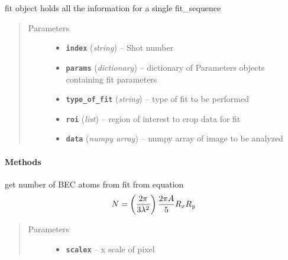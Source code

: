 \documentclass[letterpaper,10pt,english]{sphinxmanual}
\begin{document}
\begin{fulllineitems}
\label{fit_object:Fitobject.fit_object}
fit object holds all the information for a single fit\_sequence
\begin{quote}\begin{description}
\item[{Parameters}] \leavevmode\begin{itemize}
\item {} 
\textbf{\texttt{index}} (\emph{string}) -- Shot number

\item {} 
\textbf{\texttt{params}} (\emph{dictionary}) -- dictionary of Parameters objects containing fit parameters

\item {} 
\textbf{\texttt{type\_of\_fit}} (\emph{string}) -- type of fit to be performed

\item {} 
\textbf{\texttt{roi}} (\emph{list}) -- region of interest to crop data for fit

\item {} 
\textbf{\texttt{data}} (\emph{numpy array}) -- numpy array of image to be analyzed

\end{itemize}

\end{description}\end{quote}
\paragraph{Methods}

\begin{fulllineitems}
\label{fit_object:Fitobject.fit_object.BEC_num}
get number of BEC atoms from fit from equation
\begin{gather}
\begin{split}N = \left(\frac{2 \pi}{3\lambda^2}\right)\frac{2\pi A}{5}R_x R_y\end{split}\notag
\end{gather}\begin{quote}\begin{description}
\item[{Parameters}] \leavevmode\begin{itemize}
\item {} 
\textbf{\texttt{scalex}} -- x scale of pixel


\end{itemize}
\end{description}
\end{quote}
\end{fulllineitems}
\end{fulllineitems}
\end{document}
